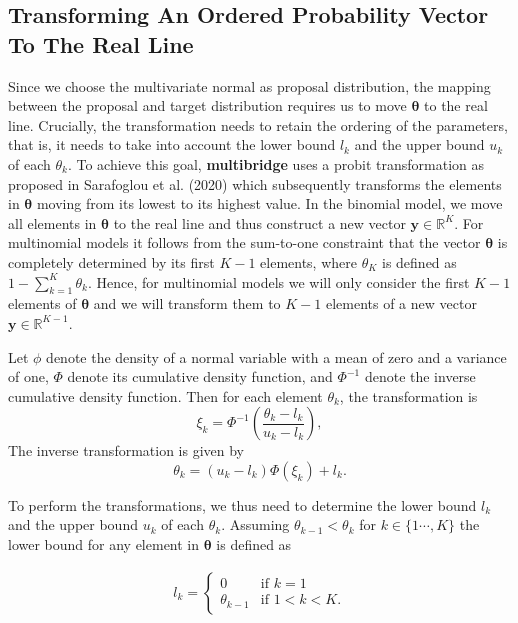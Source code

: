 \documentclass[
  english,
  man,floatsintext]{apa6}
\begin{document}
\begin{appendix}
\hypertarget{transforming-an-ordered-probability-vector-to-the-real-line}{%
\section{Transforming An Ordered Probability Vector To The Real
Line}\label{transforming-an-ordered-probability-vector-to-the-real-line}}

Since we choose the multivariate normal as proposal distribution, the
mapping between the proposal and target distribution requires us to move
\(\boldsymbol{\theta}\) to the real line. Crucially, the transformation
needs to retain the ordering of the parameters, that is, it needs to
take into account the lower bound \(l_k\) and the upper bound \(u_k\) of
each \(\theta_k\). To achieve this goal, \textbf{multibridge} uses a
probit transformation as proposed in Sarafoglou et al. (2020) which
subsequently transforms the elements in \(\boldsymbol{\theta}\) moving
from its lowest to its highest value. In the binomial model, we move all
elements in \(\boldsymbol{\theta}\) to the real line and thus construct
a new vector \(\boldsymbol{y} \in \mathbb{R}^{K}\). For multinomial
models it follows from the sum-to-one constraint that the vector
\(\boldsymbol{\theta}\) is completely determined by its first \(K - 1\)
elements, where \(\theta_K\) is defined as
\(1 - \sum_{k = 1}^K \theta_k\). Hence, for multinomial models we will
only consider the first \(K - 1\) elements of \(\boldsymbol{\theta}\)
and we will transform them to \(K - 1\) elements of a new vector
\(\boldsymbol{y} \in \mathbb{R}^{K - 1}\).

Let \(\phi\) denote the density of a normal variable with a mean of zero
and a variance of one, \(\Phi\) denote its cumulative density function,
and \(\Phi^{-1}\) denote the inverse cumulative density function. Then
for each element \(\theta_k\), the transformation is
\[\xi_k = \Phi^{-1}\left(\frac{\theta_k - l_k}{u_k - l_k}\right),\] The
inverse transformation is given by
\[\theta_k = (u_k - l_k) \Phi(\xi_k) + l_k.\]

To perform the transformations, we thus need to determine the lower
bound \(l_k\) and the upper bound \(u_k\) of each \(\theta_k\). Assuming
\(\theta_{k-1} < \theta_{k}\) for \(k \in \{1 \cdots, K\}\) the lower
bound for any element in \(\boldsymbol{\theta}\) is defined as

\begin{align*}
l_k = \left.
\begin{cases}
0 & \text{if } k = 1 \\
\theta_{k - 1} & \text{if } 1 < k < K.
\end{cases}
\right.
\end{align*}


\end{appendix}
\end{document}
